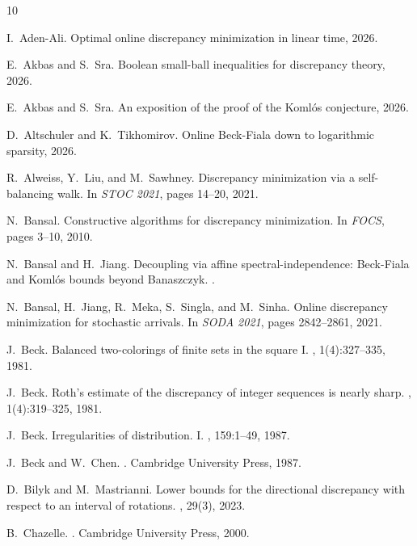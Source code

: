 \documentclass[12pt,reqno]{amsart}
\theoremstyle{remark}
\numberwithin{equation}{section}
\begin{document}
\begin{thebibliography}{10}

I.~Aden-Ali.
\newblock Optimal online discrepancy minimization in linear time, 2026.

E.~Akbas and S.~Sra.
\newblock Boolean small-ball inequalities for discrepancy theory, 2026.

E.~Akbas and S.~Sra.
\newblock An exposition of the proof of the {K}oml\'os conjecture, 2026.

D.~Altschuler and K.~Tikhomirov.
\newblock Online {B}eck-{F}iala down to logarithmic sparsity, 2026.

R.~Alweiss, Y.~Liu, and M.~Sawhney.
\newblock Discrepancy minimization via a self-balancing walk.
\newblock In {\em STOC 2021}, pages 14--20, 2021.

N.~Bansal.
\newblock Constructive algorithms for discrepancy minimization.
\newblock In {\em FOCS}, pages 3--10, 2010.

N.~Bansal and H.~Jiang.
\newblock Decoupling via affine spectral-independence: {B}eck-{F}iala and {K}oml\'os bounds beyond {B}anaszczyk.
.

N.~Bansal, H.~Jiang, R.~Meka, S.~Singla, and M.~Sinha.
\newblock Online discrepancy minimization for stochastic arrivals.
\newblock In {\em SODA 2021}, pages 2842--2861, 2021.

J.~Beck.
\newblock Balanced two-colorings of finite sets in the square {I}.
, 1(4):327--335, 1981.

J.~Beck.
\newblock Roth's estimate of the discrepancy of integer sequences is nearly sharp.
, 1(4):319--325, 1981.

J.~Beck.
\newblock Irregularities of distribution. {I}.
, 159:1--49, 1987.

J.~Beck and W.~Chen.
.
\newblock Cambridge University Press, 1987.

D.~Bilyk and M.~Mastrianni.
\newblock Lower bounds for the directional discrepancy with respect to an interval of rotations.
, 29(3), 2023.

B.~Chazelle.
.
\newblock Cambridge University Press, 2000.


\end{thebibliography}
\end{document}
